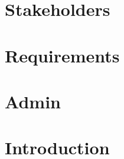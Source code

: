 \documentclass{article}
\title{}
\author{}
\date{}
\begin{document}
 \section{}
 
 \section{Stakeholders}
 
 
 \section{Requirements}
 
 
  \section{Admin}
 
\maketitle

\section{Introduction}
\end{document}
